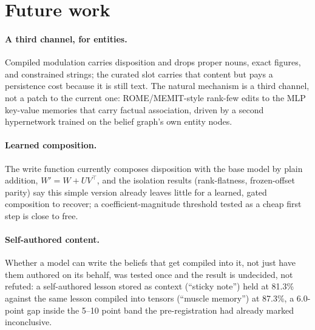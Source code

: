 \iflongversion
\section{Future work}
\label{sec:futurework}

\paragraph{A third channel, for entities.} Compiled modulation carries disposition and
drops proper nouns, exact figures, and constrained strings; the curated slot carries
that content but pays a persistence cost because it is still text. The natural
mechanism is a third channel, not a patch to the current one: ROME/MEMIT-style rank-few
edits to the MLP key-value memories that carry factual association, driven by a second
hypernetwork trained on the belief graph's own entity nodes.

\paragraph{Learned composition.} The write function currently composes disposition
with the base model by plain addition, \(W' = W + UV^\top\), and the isolation results
(rank-flatness, frozen-offset parity) say this simple version already leaves little for
a learned, gated composition to recover; a coefficient-magnitude threshold tested as a
cheap first step is close to free.

\paragraph{Self-authored content.} Whether a model can write the beliefs that get
compiled into it, not just have them authored on its behalf, was tested once and the
result is undecided, not refuted: a self-authored lesson stored as context (``sticky
note'') held at 81.3\% against the same lesson compiled into tensors (``muscle
memory'') at 87.3\%, a 6.0-point gap inside the 5--10 point band the pre-registration
had already marked inconclusive.

